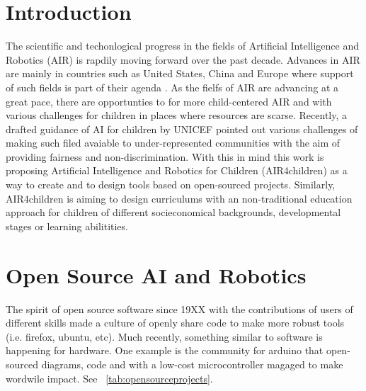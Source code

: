 \documentclass[sigconf]{acmart}
\begin{document}
\maketitle

\section{Introduction} 
The scientific and techonlogical progress in the fields of Artificial Intelligence and Robotics (AIR) is rapdily moving forward over the past decade. 
Advances in AIR are mainly in countries such as United States, China and Europe where support of such fields is part of their agenda \cite{Savage2020}. 
As the fielfs of AIR are advancing at a great pace, there are opportunties to for more child-centered AIR and with various challenges for children in places where resources are scarse. 
Recently, a drafted guidance of AI for children by UNICEF \cite{UNICEF2020} pointed out various challenges of making such filed avaiable to under-represented communities with the aim of providing fairness and non-discrimination.
With this in mind this work is proposing Artificial Intelligence and Robotics for Children (AIR4children) as a way to create and to design tools based on open-sourced projects.
Similarly, AIR4children is aiming to design curriculums with an non-traditional education approach for children of different socieconomical backgrounds, developmental stages or learning abilitities. 

\section{Open Source AI and Robotics}
The spirit of open source software since 19XX with the contributions 
of users of different skills made a culture of openly share code to make
more robust tools (i.e. firefox, ubuntu, etc). Much recently, something 
similar to software is happening for hardware. One example is the community 
for arduino that open-sourced diagrams, code and with a low-cost microcontroller
magaged to make wordwile impact. See ~\ref{tab:opensourceprojects}.
\end{document}
